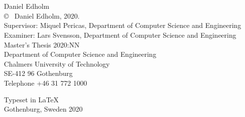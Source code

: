 \newpage
\thispagestyle{plain}
\vspace*{4.5cm}
\THETITLE\\
\TITLEDESCR\\
Daniel Edholm\\[0.5cm]

\copyright ~ Daniel Edholm, 2020.\\[0.5cm]

Supervisor: Miquel Pericas, Department of Computer Science and Engineering\\
Examiner: Lars Svensson, Department of Computer Science and Engineering\\[0.5cm]

Master's Thesis 2020:NN\\
Department of Computer Science and Engineering\\
Chalmers University of Technology\\
SE-412 96 Gothenburg\\
Telephone +46 31 772 1000\\

\vfill

Typeset in \LaTeX \\
Gothenburg, Sweden 2020
